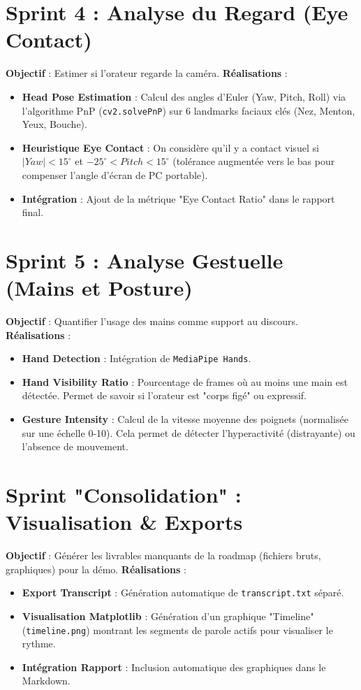 \section{Sprint 4 : Analyse du Regard (Eye Contact)}
\textbf{Objectif} : Estimer si l'orateur regarde la caméra.
\textbf{Réalisations} :
\begin{itemize}
    \item \textbf{Head Pose Estimation} : Calcul des angles d'Euler (Yaw, Pitch, Roll) via l'algorithme PnP (\texttt{cv2.solvePnP}) sur 6 landmarks faciaux clés (Nez, Menton, Yeux, Bouche).
    \item \textbf{Heuristique Eye Contact} : On considère qu'il y a contact visuel si $|Yaw| < 15^{\circ}$ et $-25^{\circ} < Pitch < 15^{\circ}$ (tolérance augmentée vers le bas pour compenser l'angle d'écran de PC portable).
    \item \textbf{Intégration} : Ajout de la métrique "Eye Contact Ratio" dans le rapport final.
\end{itemize}

\section{Sprint 5 : Analyse Gestuelle (Mains et Posture)}
\textbf{Objectif} : Quantifier l'usage des mains comme support au discours.
\textbf{Réalisations} :
\begin{itemize}
    \item \textbf{Hand Detection} : Intégration de \texttt{MediaPipe Hands}.
    \item \textbf{Hand Visibility Ratio} : Pourcentage de frames où au moins une main est détectée. Permet de savoir si l'orateur est "corps figé" ou expressif.
    \item \textbf{Gesture Intensity} : Calcul de la vitesse moyenne des poignets (normalisée sur une échelle 0-10). Cela permet de détecter l'hyperactivité (distrayante) ou l'absence de mouvement.
\end{itemize}

\section{Sprint "Consolidation" : Visualisation & Exports}
\textbf{Objectif} : Générer les livrables manquants de la roadmap (fichiers bruts, graphiques) pour la démo.
\textbf{Réalisations} :
\begin{itemize}
    \item \textbf{Export Transcript} : Génération automatique de \texttt{transcript.txt} séparé.
    \item \textbf{Visualisation Matplotlib} : Génération d'un graphique "Timeline" (\texttt{timeline.png}) montrant les segments de parole actifs pour visualiser le rythme.
    \item \textbf{Intégration Rapport} : Inclusion automatique des graphiques dans le Markdown.
\end{itemize}
